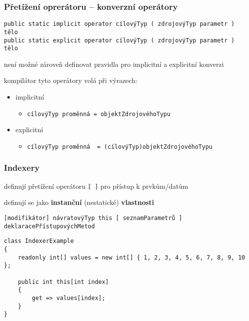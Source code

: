 \begin{frame}[fragile]
\frametitle{Přetížení oprerátoru -- konverzní operátory}
\vfill
\begin{noteblock}{}
\begin{lstlisting}
public static implicit operator cílovýTyp ( zdrojovýTyp parametr ) tělo
public static explicit operator cílovýTyp ( zdrojovýTyp parametr ) tělo
\end{lstlisting}
\end{noteblock}
\vfill
\begin{bitemize}{}
\item není možné zároveň definovat pravidla pro implicitní a explicitní konverzi
\item kompilátor tyto operátory volá při výrazech:
\begin{itemize}
\item implicitní
\begin{itemize}
\item \lstinline|cílovýTyp proměnná = objektZdrojovéhoTypu|
\end{itemize}

\item explicitní
\begin{itemize}
\item \lstinline|cílovýTyp proměnná  = (cílovýTyp)objektZdrojovéhoTypu|
\end{itemize}
\end{itemize}

\end{bitemize}
\vfill
\end{frame}

\zkouskove

\begin{frame}[fragile]
\frametitle{Indexery}
\vfill
\begin{bitemize}{}
\item definují přetížení operátoru \lstinline|[ ]| pro přístup k prvkům/datům
\item definují se jako \textbf{instanční} (nestatické) \textbf{vlastnosti}
\end{bitemize}
\vfill
\begin{noteblock}{}
\begin{lstlisting}
[modifikátor] návratovýTyp this [ seznamParametrů ] deklaracePřístupovýchMetod
\end{lstlisting}
\end{noteblock}
\vfill
\begin{yesblock}
\begin{lstlisting}
class IndexerExample
{
    readonly int[] values = new int[] { 1, 2, 3, 4, 5, 6, 7, 8, 9, 10 };

    public int this[int index]
    {
        get => values[index];
    }
}
\end{lstlisting}
\end{yesblock}
\vfill
\end{frame}


